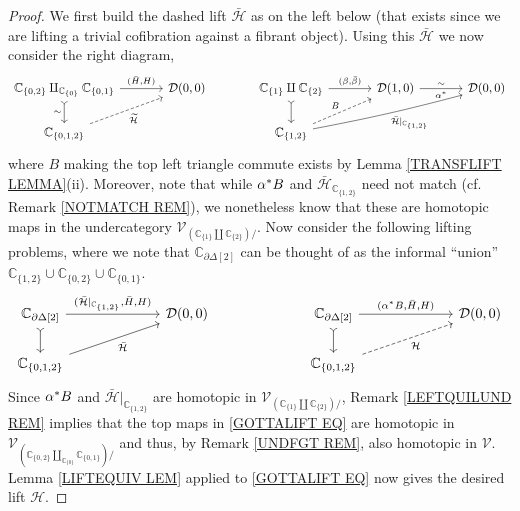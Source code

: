 \documentclass[a4paper,10pt
 ,final
]{article}%
\numberwithin{equation}{section}
\numberwithin{figure}{section}
\theoremstyle{definition} %
\newcommand{\V}{\ensuremath{\mathcal V}}
\newcommand{\1}{\ensuremath{\mathbbm 1}}%
\begin{document}
\begin{proof}
	We first build the dashed lift $\bar{\mathcal{H}}$
	as on the left below (that exists since we are lifting a trivial cofibration against a fibrant object).
	Using this $\bar{\mathcal{H}}$ we now consider the right diagram,
	\begin{equation}
	\begin{tikzcd}[column sep = 35pt]
	\mathbb{C}_{\{0,2\}} 
	\amalg_{\mathbb{C}_{\{0\}}}
	\mathbb{C}_{\{0,1\}} 
	\ar[rightarrowtail]{d}[swap]{\sim}
	\arrow{r}{(\bar{H},H)}
	&
	\mathcal{D}(0,0)
	&%
	\mathbb{C}_{\{1\}} \amalg \mathbb{C}_{\{2\}}
	\ar[rightarrowtail]{d}
	\arrow{r}{(\beta,\bar{\beta})}
	&
	\mathcal{D}(1,0)
	\ar{r}{\sim}[swap]{\alpha^{\**}}
	&
	\mathcal{D}(0,0) 
	\\
	\mathbb{C}_{\{0,1,2\}}
	\arrow[dashed]{ur}[swap]{\widetilde{\mathcal{H}}}
	&
	&%
	\mathbb{C}_{\{1,2\}}
	\ar[dashed]{ru}{B}
	\ar[bend right=2]{rru}[swap]{\bar{\mathcal{H}}|_{\mathbb{C}_{\{1,2\}}}}
	&
	&
	\end{tikzcd}
	\end{equation}
	where $B$ making the top left triangle commute exists by Lemma \ref{TRANSFLIFT LEMMA}(ii). %
	Moreover, note that while 
	$\alpha^{\**}B$ and $\bar{\mathcal{H}}_{\mathbb{C}_{\{1,2\}}}$
	need not match (cf. Remark \ref{NOTMATCH REM}),
	we nonetheless know that these are homotopic maps
	in the undercategory $\V_{\left(\mathbb{C}_{\{1\}} \amalg \mathbb{C}_{\{2\}}\right)/}$.
	Now consider the following lifting problems, 
	where we note that $\mathbb{C}_{\partial \Delta[2]}$ 
	can be thought of as the informal ``union''
	$\mathbb{C}_{\{1,2\}} \cup \mathbb{C}_{\{0,2\}} \cup \mathbb{C}_{\{0,1\}}$.
	\begin{equation}\label{GOTTALIFT EQ}
	\begin{tikzcd}[column sep = 65pt]
	\mathbb{C}_{\partial \Delta[2]}
	\ar[rightarrowtail]{d}
	\arrow{r}{(\bar{\mathcal{H}}|_{\mathbb{C}_{\{1,2\}}},\bar{H},H)}
	&
	\mathcal{D}(0,0)
	&%
	\mathbb{C}_{\partial \Delta[2]}
	\ar[rightarrowtail]{d}
	\arrow{r}{(\alpha^{\**}B,\bar{H},H)}
	&
	\mathcal{D}(0,0)
	\\
	\mathbb{C}_{\{0,1,2\}} \ar{ru}[swap]{\bar{\mathcal{H}}}
	&
	&%
	\mathbb{C}_{\{0,1,2\}} \ar[dashed]{ru}[swap]{\mathcal{H}}
	&
	\end{tikzcd}
	\end{equation}
	Since $\alpha^{\**}B$ and $\bar{\mathcal{H}}|_{\mathbb{C}_{\{1,2\}}}$
	are homotopic in 
	$\V_{\left(\mathbb{C}_{\{1\}} \amalg \mathbb{C}_{\{2\}}\right)/}$,
	Remark \ref{LEFTQUILUND REM}
	implies that the top maps in \eqref{GOTTALIFT EQ}
	are homotopic in 
	$\V_{\left(
		\mathbb{C}_{\{0,2\}} \amalg_{\mathbb{C}_{\{0\}}} \mathbb{C}_{\{0,1\}}
		\right)/}$ and thus,
	by Remark \ref{UNDFGT REM}, also homotopic in 
	$\V$.
	Lemma \ref{LIFTEQUIV LEM} applied to \eqref{GOTTALIFT EQ}
	now gives the desired lift $\mathcal{H}$.
\end{proof}
\end{document}

